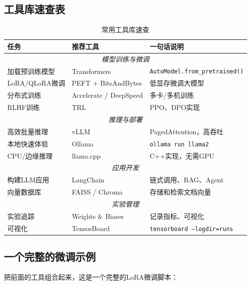 \subsection*{工具库速查表}

\begin{table}[htbp]
\centering
\small
\renewcommand{\arraystretch}{1.4}
\begin{tabular}{l|l|l}
\toprule
\textbf{任务} & \textbf{推荐工具} & \textbf{一句话说明} \\
\midrule
\multicolumn{3}{c}{\textit{模型训练与微调}} \\
\midrule
加载预训练模型 & Transformers & \texttt{AutoModel.from\_pretrained()} \\
LoRA/QLoRA微调 & PEFT + BitsAndBytes & 低显存微调大模型 \\
分布式训练 & Accelerate / DeepSpeed & 多卡/多机训练 \\
RLHF训练 & TRL & PPO、DPO实现 \\
\midrule
\multicolumn{3}{c}{\textit{推理与部署}} \\
\midrule
高效批量推理 & vLLM & PagedAttention，高吞吐 \\
本地快速体验 & Ollama & \texttt{ollama run llama2} \\
CPU/边缘推理 & llama.cpp & C++实现，无需GPU \\
\midrule
\multicolumn{3}{c}{\textit{应用开发}} \\
\midrule
构建LLM应用 & LangChain & 链式调用、RAG、Agent \\
向量数据库 & FAISS / Chroma & 存储和检索文档向量 \\
\midrule
\multicolumn{3}{c}{\textit{实验管理}} \\
\midrule
实验追踪 & Weights \& Biases & 记录指标、可视化 \\
可视化 & TensorBoard & \texttt{tensorboard --logdir=runs} \\
\bottomrule
\end{tabular}
\caption{常用工具库速查}
\end{table}

\subsection*{一个完整的微调示例}

把前面的工具组合起来，这是一个完整的LoRA微调脚本：

